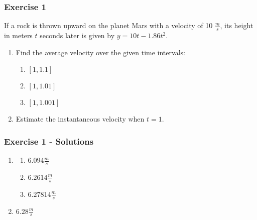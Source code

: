 \documentclass[12pt]{beamer}
\begin{document}
\begin{frame}
	\frametitle{Exercise 1}
	\vspace*{\fill}
	\initclock
	If a rock is thrown upward on the planet Mars with a velocity of 10 $\tfrac{m}{s}$, its height in meters $t$ seconds later is given by $y=10t-1.86t^2$.
	\vspace*{\fill}
	\vspace*{\fill}
	\begin{enumerate}
		\item Find the average velocity over the given time intervals:
		      \begin{multicols}{3}
			      \begin{enumerate}
				      \item $[1, 1.1]$
				      \item $[1, 1.01]$
				      \item $[1, 1.001]$
			      \end{enumerate}
		      \end{multicols}
		      \vspace*{\fill}
		\item Estimate the instantaneous velocity when $t=1$.
	\end{enumerate}
	\vspace*{\fill}
	\vspace*{\fill}
	\vspace*{\fill}
	\vspace*{\fill}
	\crono
\end{frame}
\begin{frame}
	\frametitle{Exercise 1 - Solutions}
	\vspace*{\fill}
	\vspace*{\fill}
	\begin{enumerate}
		\item
		      \begin{multicols}{3}
			      \begin{enumerate}
				      \item $6.094\tfrac{m}{s}$
				      \item $6.2614\tfrac{m}{s}$
				      \item $6.27814\tfrac{m}{s}$
			      \end{enumerate}
		      \end{multicols}
		      \vspace*{\fill}
		\item $6.28\tfrac{m}{s}$
	\end{enumerate}
	\vspace*{\fill}
	\vspace*{\fill}
	\vspace*{\fill}
	\vspace*{\fill}
\end{frame}
\end{document}
